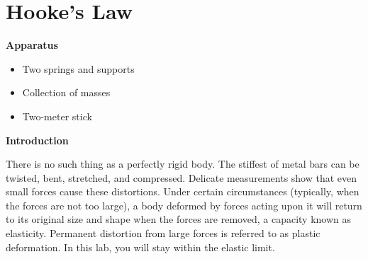 \section{Hooke's Law}

\makelabheader %

\bigskip
\textbf{Apparatus}
\begin{itemize}[nosep]
\item Two springs and supports 
\item Collection of masses 
\item Two-meter stick
\end{itemize}

\bigskip
\textbf{Introduction}

There is no such thing as a perfectly rigid body. The stiffest of metal bars can be twisted, bent, stretched, and compressed. Delicate measurements show that even small forces cause these distortions. Under certain circumstances (typically, when the forces are not too large), a body deformed by forces acting upon it will return to its original size and shape when the forces are removed, a capacity known as elasticity. Permanent distortion from large forces is referred to as plastic deformation. In this lab, you will stay within the elastic limit.


